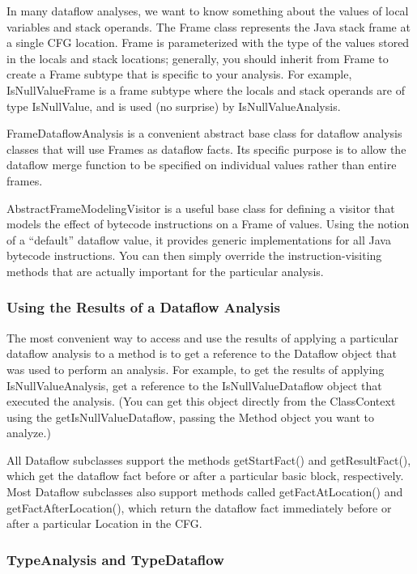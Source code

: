 \documentclass[11pt]{article}
\begin{document}
In many dataflow analyses, we want to know something about the
values of local variables and stack operands.  The Frame class represents
the Java stack frame at a single CFG location.  Frame is parameterized
with the type of the values stored in the locals and stack locations;
generally, you should inherit from Frame to create a Frame subtype that
is specific to your analysis.  For example, IsNullValueFrame is a frame
subtype where the locals and stack operands are of type IsNullValue,
and is used (no surprise) by IsNullValueAnalysis.

FrameDataflowAnalysis is a convenient abstract base class for dataflow analysis
classes that will use Frames as dataflow facts.  Its specific purpose is
to allow the dataflow merge function to be specified on individual values
rather than entire frames.

AbstractFrameModelingVisitor is a useful base class for defining a visitor
that models the effect of bytecode instructions on a Frame of values.
Using the notion of a ``default'' dataflow value, it provides generic implementations
for all Java bytecode instructions.  You can then simply override the
instruction-visiting methods that are actually important for the particular
analysis.

\subsubsection{Using the Results of a Dataflow Analysis}

The most convenient way to access and use the results of applying
a particular dataflow analysis to a method is to get a reference to the
Dataflow object that was used to perform an analysis.  For example,
to get the results of applying IsNullValueAnalysis, get a reference to
the IsNullValueDataflow object that executed the analysis.  (You can get
this object directly from the ClassContext using the
getIsNullValueDataflow, passing the Method object you want to analyze.)

All Dataflow subclasses support the methods getStartFact() and getResultFact(),
which get the dataflow fact before or after a particular basic block, respectively.
Most Dataflow subclasses also support methods called getFactAtLocation() and
getFactAfterLocation(), which return the dataflow fact immediately before
or after a particular Location in the CFG.

\subsubsection{TypeAnalysis and TypeDataflow}
\end{document}
